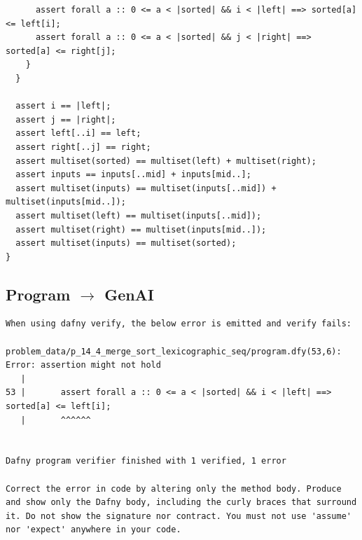 \documentclass{article}
\begin{document}
\begin{lstlisting}
      assert forall a :: 0 <= a < |sorted| && i < |left| ==> sorted[a] <= left[i];
      assert forall a :: 0 <= a < |sorted| && j < |right| ==> sorted[a] <= right[j];
    }
  }

  assert i == |left|;
  assert j == |right|;
  assert left[..i] == left;
  assert right[..j] == right;
  assert multiset(sorted) == multiset(left) + multiset(right);
  assert inputs == inputs[..mid] + inputs[mid..];
  assert multiset(inputs) == multiset(inputs[..mid]) + multiset(inputs[mid..]);
  assert multiset(left) == multiset(inputs[..mid]);
  assert multiset(right) == multiset(inputs[mid..]);
  assert multiset(inputs) == multiset(sorted);
}
\end{lstlisting}
\subsection*{Program $\rightarrow$ GenAI}
\begin{lstlisting}
When using dafny verify, the below error is emitted and verify fails:

problem_data/p_14_4_merge_sort_lexicographic_seq/program.dfy(53,6): Error: assertion might not hold
   |
53 |       assert forall a :: 0 <= a < |sorted| && i < |left| ==> sorted[a] <= left[i];
   |       ^^^^^^


Dafny program verifier finished with 1 verified, 1 error

Correct the error in code by altering only the method body. Produce and show only the Dafny body, including the curly braces that surround it. Do not show the signature nor contract. You must not use 'assume' nor 'expect' anywhere in your code.
\end{lstlisting}
\end{document}
